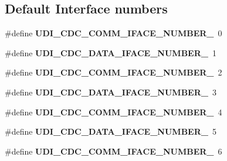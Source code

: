\subsection*{Default Interface numbers}
\begin{DoxyCompactItemize}
\item 
\hypertarget{group__udi__cdc__group__single__desc_gaa72bb6864eae7093300538949bf5d2cf}{\#define {\bfseries U\-D\-I\-\_\-\-C\-D\-C\-\_\-\-C\-O\-M\-M\-\_\-\-I\-F\-A\-C\-E\-\_\-\-N\-U\-M\-B\-E\-R\-\_}~0}\label{group__udi__cdc__group__single__desc_gaa72bb6864eae7093300538949bf5d2cf}

\item 
\hypertarget{group__udi__cdc__group__single__desc_ga4900aae039b50c8b0304fb72bce2f08f}{\#define {\bfseries U\-D\-I\-\_\-\-C\-D\-C\-\_\-\-D\-A\-T\-A\-\_\-\-I\-F\-A\-C\-E\-\_\-\-N\-U\-M\-B\-E\-R\-\_}~1}\label{group__udi__cdc__group__single__desc_ga4900aae039b50c8b0304fb72bce2f08f}

\item 
\hypertarget{group__udi__cdc__group__single__desc_ga73aa3a846dcb14fe0db7d24537e17968}{\#define {\bfseries U\-D\-I\-\_\-\-C\-D\-C\-\_\-\-C\-O\-M\-M\-\_\-\-I\-F\-A\-C\-E\-\_\-\-N\-U\-M\-B\-E\-R\-\_}~2}\label{group__udi__cdc__group__single__desc_ga73aa3a846dcb14fe0db7d24537e17968}

\item 
\hypertarget{group__udi__cdc__group__single__desc_gace227616da1eec96b10427427336ae9d}{\#define {\bfseries U\-D\-I\-\_\-\-C\-D\-C\-\_\-\-D\-A\-T\-A\-\_\-\-I\-F\-A\-C\-E\-\_\-\-N\-U\-M\-B\-E\-R\-\_}~3}\label{group__udi__cdc__group__single__desc_gace227616da1eec96b10427427336ae9d}

\item 
\hypertarget{group__udi__cdc__group__single__desc_ga51746df1068a46e8f8380d4d9637de7d}{\#define {\bfseries U\-D\-I\-\_\-\-C\-D\-C\-\_\-\-C\-O\-M\-M\-\_\-\-I\-F\-A\-C\-E\-\_\-\-N\-U\-M\-B\-E\-R\-\_}~4}\label{group__udi__cdc__group__single__desc_ga51746df1068a46e8f8380d4d9637de7d}

\item 
\hypertarget{group__udi__cdc__group__single__desc_gaf2332783751108d3a7196331d422d648}{\#define {\bfseries U\-D\-I\-\_\-\-C\-D\-C\-\_\-\-D\-A\-T\-A\-\_\-\-I\-F\-A\-C\-E\-\_\-\-N\-U\-M\-B\-E\-R\-\_}~5}\label{group__udi__cdc__group__single__desc_gaf2332783751108d3a7196331d422d648}

\item 
\hypertarget{group__udi__cdc__group__single__desc_gafcba0da585d8286250a25bb60d5fe2a0}{\#define {\bfseries U\-D\-I\-\_\-\-C\-D\-C\-\_\-\-C\-O\-M\-M\-\_\-\-I\-F\-A\-C\-E\-\_\-\-N\-U\-M\-B\-E\-R\-\_}~6}\label{group__udi__cdc__group__single__desc_gafcba0da585d8286250a25bb60d5fe2a0}


\end{DoxyCompactItemize}
